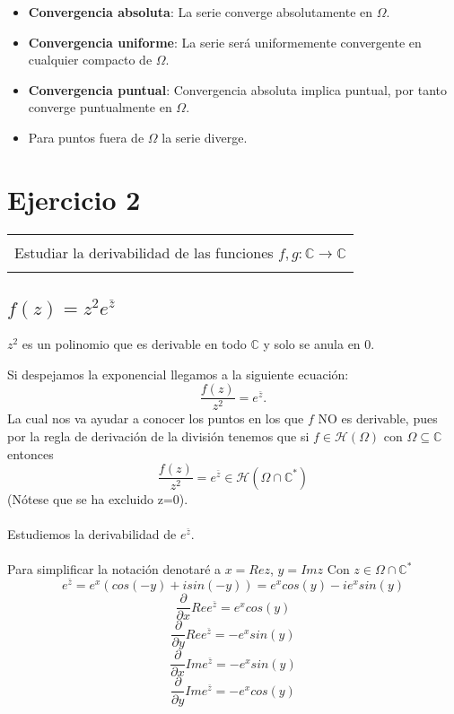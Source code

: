 \documentclass[12pt]{article}
\newenvironment{micaja}
{
    \begin{center}
    \begin{tabular}{|p{0.9\textwidth}|}
    \hline\\
    }   
    {   
    \\\\\hline
    \end{tabular} 
    \end{center}
    }
\begin{document}
\begin{itemize}
\item \textbf{Convergencia absoluta}:  
La serie converge absolutamente en $\Omega.$ 
\item \textbf{Convergencia uniforme}:
 La serie será uniformemente convergente en cualquier compacto de $\Omega.$
\item \textbf{Convergencia puntual}: Convergencia absoluta implica puntual, por tanto converge puntualmente en $\Omega.$ 
\item Para puntos fuera de $\Omega$ la serie diverge. 
\end{itemize}

\newpage
\section{Ejercicio 2}  
\begin{micaja}

    Estudiar la derivabilidad  de las funciones $f,g: \mathbb C \rightarrow \mathbb C$
\end{micaja}

\subsection{$f(z)=z^2 e^{\bar z}$}

$z^2$ es un polinomio que es derivable en todo $\mathbb C$ y solo se anula en $0.$ 

Si despejamos la exponencial llegamos a la siguiente ecuación:
$$\frac{f(z)}{z^2} = e^{\bar z}.$$
La cual nos va ayudar a conocer los puntos en los que $f$ NO es derivable,
pues por la regla de derivación de la división tenemos que si $f \in \mathcal H(\Omega)$ con $\Omega \subseteq \mathbb C$ entonces 
$$\frac{f(z)}{z^2} =  e^{\bar z} \in \mathcal H(\Omega \cap \mathbb C^*)$$ 
(Nótese que se ha excluido z=0).   \paragraph{}

Estudiemos la derivabilidad de $e^{\bar z}$. \paragraph{}

Para simplificar la notación denotaré a $x = Re z$, $y = Im z$ Con $z \in \Omega \cap \mathbb C^*$
$$e^{\bar z} = e^x (cos(-y) + i sin(-y)) = e^x cos(y) - i e^x sin(y)$$
$$\frac{\partial}{\partial x} Re e^{\bar z} = e^x cos(y)$$
$$\frac{\partial}{\partial y} Re e^{\bar z} = - e^x sin(y)$$
$$\frac{\partial}{\partial x} Im e^{\bar z} = - e^x sin(y)$$
$$\frac{\partial}{\partial y} Im e^{\bar z} = - e^x cos(y)$$
\end{document}
